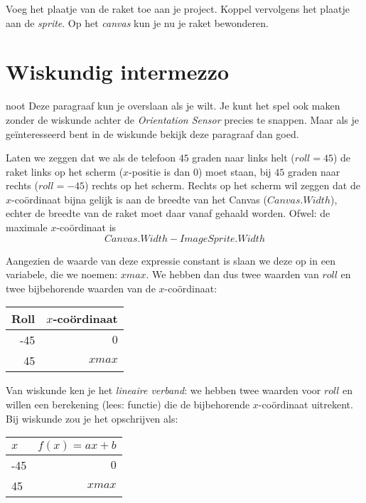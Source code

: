 \begin{opgave}
    \opgVraag
  Voeg het plaatje van de raket toe aan je project. Koppel vervolgens het plaatje aan de \emph{sprite}. Op het \emph{canvas} kun je nu je raket bewonderen.
\end{opgave}
 

\section{Wiskundig intermezzo}
\begin{derivation}{noot}
Deze paragraaf kun je overslaan als je wilt. Je kunt het spel ook maken zonder de wiskunde achter de \emph{Orientation Sensor} precies te snappen. Maar als je ge\"interesseerd bent in de wiskunde bekijk deze paragraaf dan goed.
\end{derivation}

Laten we zeggen dat we als de telefoon $45$ graden naar links helt ($roll=45$) de raket links op het scherm ($x$-positie is dan $0$) moet staan, bij $45$ graden naar rechts ($roll= -45$) rechts op het scherm. Rechts op het scherm wil zeggen dat de $x$-co\"ordinaat bijna gelijk is aan de breedte van het Canvas ($Canvas.Width$), echter de breedte van de raket moet daar vanaf gehaald worden. Ofwel: de maximale $x$-co\"ordinaat is 
\[
     Canvas.Width - ImageSprite.Width
\]

Aangezien de waarde van deze expressie constant is slaan we deze op in een variabele, die we noemen: $xmax$. We hebben dan dus twee waarden van $roll$ en twee bijbehorende waarden van de $x$-co\"ordinaat:
\begin{center}
  \begin{tabular}{ r | r }
    \hline
	Roll	&	$x$-co\"ordinaat  \\
	\hline 
	-45	&	$0$             \\
	45	&	$xmax$          \\
    \hline
  \end{tabular}
\end{center}

Van wiskunde ken je het \emph{lineaire verband}: we hebben twee waarden voor $roll$ en willen een berekening (lees: functie) die de bijbehorende $x$-co\"ordinaat uitrekent. Bij wiskunde zou je het opschrijven als: 

\begin{center}
  \begin{tabular}{ l | r }
    \hline
	$x$	&	 $ f(x) = ax + b $  \\
	\hline
	-45	&	$0$               \\

	45	& 	$xmax$            \\
    \hline
  \end{tabular}
\end{center}

